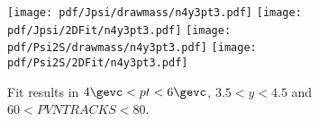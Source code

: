 \begin{figure}[H]
\begin{center}
\texttt{[image: pdf/Jpsi/drawmass/n4y3pt3.pdf]}
\texttt{[image: pdf/Jpsi/2DFit/n4y3pt3.pdf]}
\vspace*{-0.5cm}
\texttt{[image: pdf/Psi2S/drawmass/n4y3pt3.pdf]}
\texttt{[image: pdf/Psi2S/2DFit/n4y3pt3.pdf]}
\vspace*{-0.5cm}
\end{center}
\caption{Fit results in $4\gevc<pt<6\gevc$, $3.5<y<4.5$ and $60<PVNTRACKS<80$.}
\label{Fitn4y3pt3}
\end{figure}
